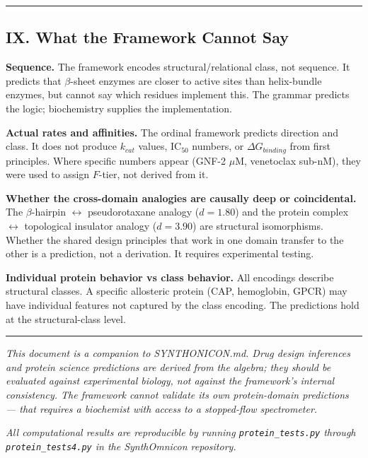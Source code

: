 \documentclass[10pt,a4paper]{article}
\begin{document}
\begin{center}
\rule{0.5\textwidth}{0.4pt}
\end{center}

\subsection{IX. What the Framework Cannot Say}

\textbf{Sequence.} The framework encodes structural/relational class, not sequence. It predicts that $\beta$-sheet enzymes are closer to active sites than helix-bundle enzymes, but cannot say which residues implement this. The grammar predicts the logic; biochemistry supplies the implementation.

\textbf{Actual rates and affinities.} The ordinal framework predicts direction and class. It does not produce $k_{cat}$ values, $\text{IC}_{50}$ numbers, or $\Delta G_{binding}$ from first principles. Where specific numbers appear (GNF-2 $\mu$M, venetoclax sub-nM), they were used to assign $F$-tier, not derived from it.

\textbf{Whether the cross-domain analogies are causally deep or coincidental.} The $\beta$-hairpin $\leftrightarrow$ pseudorotaxane analogy ($d = 1.80$) and the protein complex $\leftrightarrow$ topological insulator analogy ($d = 3.90$) are structural isomorphisms. Whether the shared design principles that work in one domain transfer to the other is a prediction, not a derivation. It requires experimental testing.

\textbf{Individual protein behavior vs class behavior.} All encodings describe structural classes. A specific allosteric protein (CAP, hemoglobin, GPCR) may have individual features not captured by the class encoding. The predictions hold at the structural-class level.

\begin{center}
\rule{0.5\textwidth}{0.4pt}
\end{center}

\emph{This document is a companion to SYNTHONICON.md. Drug design inferences and protein science predictions are derived from the algebra; they should be evaluated against experimental biology, not against the framework's internal consistency. The framework cannot validate its own protein-domain predictions --- that requires a biochemist with access to a stopped-flow spectrometer.}

\emph{All computational results are reproducible by running \texttt{protein\_tests.py} through \texttt{protein\_tests4.py} in the SynthOmnicon repository.}
\end{document}
